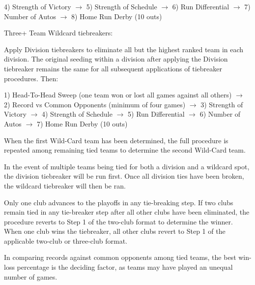 \begin{deepEnumerate}
\begin{deepEnumerate}
\begin{deepEnumerate}
\begin{deepEnumerate}
\begin{deepEnumerate}
					4) Strength of Victory $\rightarrow$ 
					5) Strength of Schedule $\rightarrow$ 
					6) Run Differential $\rightarrow$  
					7) Number of Autos $\rightarrow$  
					8) Home Run Derby (10 outs)
					\item Three+ Team Wildcard tiebreakers:
					\begin{deepEnumerate}
						\item Apply Division tiebreakers to eliminate all but the highest ranked team in each division.
						The original seeding within a division after applying the Division tiebreaker remains the same for all
						subsequent applications of tiebreaker procedures. Then:
						\item 1) Head-To-Head Sweep (one team won or lost all games against all others)  $\rightarrow$  
						2) Record vs Common Opponents (minimum of four games) $\rightarrow$ 
						3) Strength of Victory $\rightarrow$ 
						4) Strength of Schedule $\rightarrow$ 
						5) Run Differential $\rightarrow$  
						6) Number of Autos $\rightarrow$  
						7) Home Run Derby (10 outs)
						\item When the first Wild-Card team has been determined, the full procedure is repeated among remaining tied teams 
						to determine the second Wild-Card team.
					\end{deepEnumerate}
				\end{deepEnumerate}
				\item In the event of multiple teams being tied for both a division and a wildcard spot, the division tiebreaker will be run first.
				Once all division ties have been broken, the wildcard tiebreaker will then be ran.
				\item Only one club advances to the playoffs in any tie-breaking step. If two clubs remain tied in any tie-breaker step
				after all other clubs have been eliminated, the procedure reverts to Step 1 of the two-club format to determine the winner.
				When one club wins the tiebreaker, all other clubs revert to Step 1 of the applicable two-club or three-club format.
				\item In comparing records against common opponents among tied teams, the best win-loss percentage is the deciding factor,
				as teams may have played an unequal number of games.
			\end{deepEnumerate}
		\end{deepEnumerate}
	\end{deepEnumerate}
\end{deepEnumerate}
